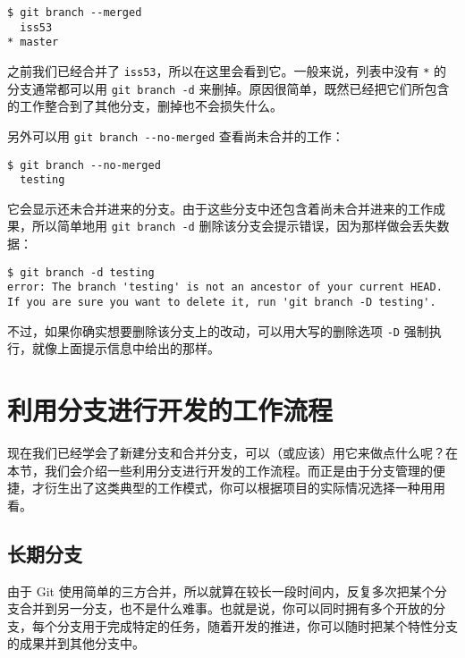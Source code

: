 \documentclass[a4paper]{book}
\begin{document}
\begin{shaded}\begin{verbatim}
$ git branch --merged
  iss53
* master
\end{verbatim}\end{shaded}

之前我们已经合并了 \texttt{iss53}，所以在这里会看到它。一般来说，列表中没有 \texttt{*} 的分支通常都可以用 \texttt{git branch -d} 来删掉。原因很简单，既然已经把它们所包含的工作整合到了其他分支，删掉也不会损失什么。

另外可以用 \texttt{git branch -{}-no-merged} 查看尚未合并的工作：

\begin{shaded}\begin{verbatim}
$ git branch --no-merged
  testing
\end{verbatim}\end{shaded}

它会显示还未合并进来的分支。由于这些分支中还包含着尚未合并进来的工作成果，所以简单地用 \texttt{git branch -d} 删除该分支会提示错误，因为那样做会丢失数据：

\begin{shaded}\begin{verbatim}
$ git branch -d testing
error: The branch 'testing' is not an ancestor of your current HEAD.
If you are sure you want to delete it, run 'git branch -D testing'.
\end{verbatim}\end{shaded}

不过，如果你确实想要删除该分支上的改动，可以用大写的删除选项 \texttt{-D} 强制执行，就像上面提示信息中给出的那样。

\section{利用分支进行开发的工作流程}

现在我们已经学会了新建分支和合并分支，可以（或应该）用它来做点什么呢？在本节，我们会介绍一些利用分支进行开发的工作流程。而正是由于分支管理的便捷，才衍生出了这类典型的工作模式，你可以根据项目的实际情况选择一种用用看。

\subsection{长期分支}

由于 Git 使用简单的三方合并，所以就算在较长一段时间内，反复多次把某个分支合并到另一分支，也不是什么难事。也就是说，你可以同时拥有多个开放的分支，每个分支用于完成特定的任务，随着开发的推进，你可以随时把某个特性分支的成果并到其他分支中。
\end{document}
